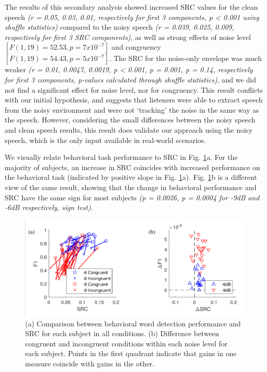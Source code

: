 \documentclass[10pt,letterpaper]{article}
\begin{document}
  The results of this secondary analysis showed increased 
  SRC values for the clean 
  speech \textit{(r = 0.05, 0.03, 0.01, respectively for first 3 components,
  p < 0.001 using shuffle statistics)} 
  compared to the noisy speech \textit{(r = 0.039, 0.025, 0.009, respectively
  for first 3 SRC components)}, as well as strong effects of noise level 
  $[F(1, 19) = 52.53, p = 7 x 10^{-7}]$ and congruency
  $[F(1, 19) = 54.43, p = 5 x 10^{-7}]$. The SRC for the noise-only envelope 
  was much weaker \textit{(r = 0.01, 0.0047, 0.0019, p < 0.001, p = 0.001, 
  p = 0.14, respectively for first 3 components, p-values calculated through
  shuffle statistics)}, and we did not find a significant effect for noise 
  level, nor for congruency. This result conflicts with our initial hypothesis,
  and suggests that listeners were able to extract speech from the noisy 
  environment and were not `tracking' the noise in the same way as the speech.
  However, considering the small differences between the noisy speech and 
  clean speech results, this result does validate our approach using the 
  noisy speech, which is the only input available in real-world scenarios.

  We visually relate behavioral task performance to SRC
  in Fig. \ref{srcVsBehavior}a. For the majority of subjects, an increase 
  in SRC coincides with increased performance on the behavioral task 
  (indicated by positive slope in Fig. \ref{srcVsBehavior}a). Fig. 
  \ref{srcVsBehavior}b is a different view of the same result, showing that
  the change in behavioral performance and SRC have the same sign for most 
  subjects \textit{(p = 0.0026, p = 0.0004 for -9dB and -6dB respectively, 
  sign test)}.

  \begin{figure}[]
    \begin{center}
      \includegraphics[scale=0.8]{Figure5ab}
    \end{center}
    \caption{(a) Comparison between behavioral word detection performance
    and SRC for each subject in all conditions. (b) Difference between
    congruent and incongruent conditions within each noise level for
    each subject. Points in the first quadrant indicate that gains in
    one measure coincide with gains in the other.}
    \label{srcVsBehavior}
  \end{figure}
\end{document}
